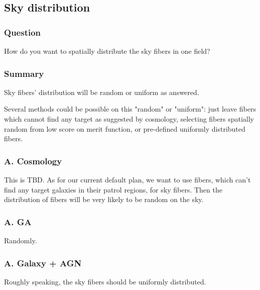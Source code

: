 \documentclass[a4paper,notitlepage]{article}
\begin{document}
\subsection{Sky distribution}

\subsubsection{Question}
How do you want to spatially distribute the sky fibers in one field? 

\subsubsection{Summary}

Sky fibers' distribution will be random or uniform as answered. 

Several methods could be possible on this "random" or "uniform": 
just leave fibers which cannot find any target as suggested by cosmology, 
selecting fibers spatially random from low score on merit function, 
or 
pre-defined uniformly distributed fibers. 

\subsubsection{A. Cosmology}

This is TBD. As for our current default plan, we want to use
fibers, which can't find any target galaxies in their patrol regions,
for sky fibers. Then the distribution of fibers will be very likely to
be random on the sky.


\subsubsection{A. GA}
Randomly.

\subsubsection{A. Galaxy + AGN}

Roughly speaking, the sky fibers should be uniformly distributed. 

\renewcommand{\thesubsection}{Q.3.0-\alph{subsection}}
\setcounter{subsection}{0}
\end{document}
